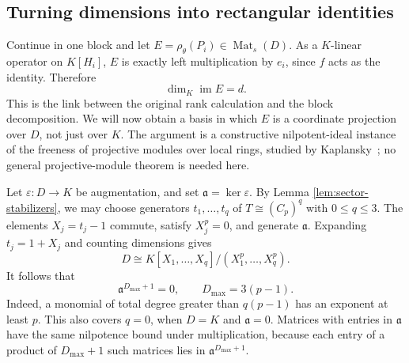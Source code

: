 \subsection{Turning dimensions into rectangular identities}

Continue in one block and let $E=\rho_\theta(P_i)\in
\operatorname{Mat}_s(D)$.  As a $K$-linear operator on $K[H_i]$,
$E$ is exactly left multiplication by $e_i$, since $f$ acts as the
identity.  Therefore
\begin{equation}\label{eq:sector-regular-rank}
 \dim_K\operatorname{im}E=d.
\end{equation}
This is the link between the original rank calculation and the block
decomposition.  We will now obtain a basis in which $E$ is a coordinate
projection over $D$, not just over $K$. The argument is a constructive
nilpotent-ideal instance of the freeness of projective modules over local
rings, studied by Kaplansky~\cite[Theorem~2]{Kaplansky1958}; no general projective-module
theorem is needed here.

Let $\varepsilon:D\to K$ be augmentation, and set
$\mathfrak a=\ker\varepsilon$.  By Lemma
\ref{lem:sector-stabilizers}, we may choose generators
$t_1,\ldots,t_q$ of $T\cong(C_p)^q$ with $0\le q\le3$.
The elements $X_j=t_j-1$ commute, satisfy $X_j^p=0$, and generate
$\mathfrak a$.  Expanding $t_j=1+X_j$ and counting dimensions gives
\[
 D\cong K[X_1,\ldots,X_q]/(X_1^p,\ldots,X_q^p).
\]
It follows that
\[
 \mathfrak a^{D_{\max}+1}=0,\qquad D_{\max}=3(p-1).
\]
Indeed, a monomial of total degree greater than $q(p-1)$ has an
exponent at least $p$.  This also covers $q=0$, when
$D=K$ and $\mathfrak a=0$.  Matrices with entries in $\mathfrak a$
have the same nilpotence bound under multiplication, because each
entry of a product of $D_{\max}+1$ such matrices lies in
$\mathfrak a^{D_{\max}+1}$.

